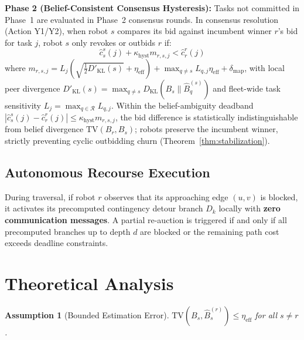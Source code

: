 \documentclass[lettersize,journal]{IEEEtran}
\newtheorem{assumption}{Assumption}
\begin{document}
\noindent\textbf{Phase 2 (Belief-Consistent Consensus Hysteresis):} Tasks not committed in Phase~1 are evaluated in Phase~2 consensus rounds. In consensus resolution (Action Y1/Y2), when robot $s$ compares its bid against incumbent winner $r$'s bid for task $j$, robot $s$ only revokes or outbids $r$ if:
\begin{equation}
    \hat{c}_s^s(j) + \kappa_{\text{hyst}} m_{r,s,j} < \hat{c}_r^r(j)
\label{eq:consensus_hysteresis}
\end{equation}
where $m_{r,s,j} = L_j \left( \sqrt{\frac{1}{2} D'_{\text{KL}}(s)} + \eta_{\text{eff}} \right) + \max_{q \ne s} L_{q,j} \eta_{\text{eff}} + \delta_{\text{map}}$, with local peer divergence $D'_{\text{KL}}(s) = \max_{q \ne s} D_{\text{KL}}(B_s \parallel \hat{B}_q^{(s)})$ and fleet-wide task sensitivity $L_j = \max_{q \in \mathcal{R}} L_{q, j}$. Within the belief-ambiguity deadband $|\hat{c}_s^s(j) - \hat{c}_r^r(j)| \le \kappa_{\text{hyst}} m_{r,s,j}$, the bid difference is statistically indistinguishable from belief divergence $\mathrm{TV}(B_r, B_s)$; robots preserve the incumbent winner, strictly preventing cyclic outbidding churn (Theorem~\ref{thm:stabilization}).

\subsection{Autonomous Recourse Execution}
During traversal, if robot $r$ observes that its approaching edge $(u, v)$ is blocked, it activates its precomputed contingency detour branch $D_k$ locally with \textbf{zero communication messages}. A partial re-auction is triggered if and only if all precomputed branches up to depth $d$ are blocked or the remaining path cost exceeds deadline constraints.

\section{Theoretical Analysis}

\begin{assumption}[Bounded Estimation Error]
$\mathrm{TV}(B_s, \hat{B}_s^{(r)}) \leq \eta_{\text{eff}}$ for all $s \ne r$.
\label{ass:tom}
\end{assumption}
\end{document}
